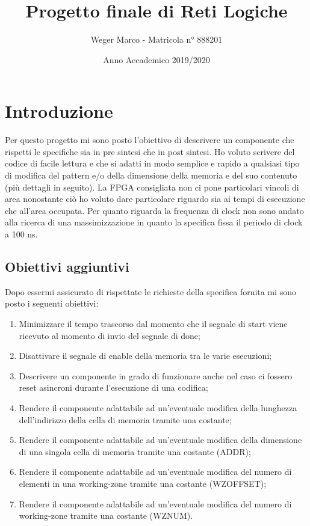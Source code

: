 \documentclass{article}
\begin{document}
\title{Progetto finale di Reti Logiche}
\author{Weger Marco - Matricola n° 888201}
\date{Anno Accademico 2019/2020}
\maketitle

\tableofcontents

\newpage
{}
\section{Introduzione}
Per questo progetto mi sono posto l'obiettivo di descrivere un componente che rispetti le specifiche sia in pre sintesi che in post sintesi.
Ho voluto scrivere del codice di facile lettura e che si adatti in modo semplice e rapido a qualsiasi tipo di modifica del pattern e/o della dimensione della memoria e del suo contenuto (più dettagli in seguito).
La FPGA consigliata non ci pone particolari vincoli di area nonostante ciò ho voluto dare particolare riguardo sia ai tempi di esecuzione che all'area occupata.
Per quanto riguarda la frequenza di clock non sono andato alla ricerca di una massimizzazione in quanto la specifica fissa il periodo di clock a 100 ns.
\subsection{Obiettivi aggiuntivi}
Dopo essermi assicurato di rispettate le richieste della specifica fornita mi sono posto i seguenti obiettivi:
\begin{enumerate}
	\item Minimizzare il tempo trascorso dal momento che il segnale di start viene ricevuto al momento di invio del segnale di done;
	\item Disattivare il segnale di enable della memoria tra le varie esecuzioni;
	\item Descrivere un componente in grado di funzionare anche nel caso ci fossero reset asincroni durante l'esecuzione di una codifica;
	\item Rendere il componente adattabile ad un'eventuale modifica della lunghezza dell'indirizzo della cella di memoria tramite una costante;
	\item Rendere il componente adattabile ad un'eventuale modifica della dimensione di una singola cella di memoria tramite una costante (ADDR);
	\item Rendere il componente adattabile ad un'eventuale modifica del numero di elementi in una working-zone tramite una costante (WZ\textunderscore OFFSET);
	\item Rendere il componente adattabile ad un'eventuale modifica del numero di working-zone tramite una costante (WZ\textunderscore NUM).
\end{enumerate}
\end{document}
